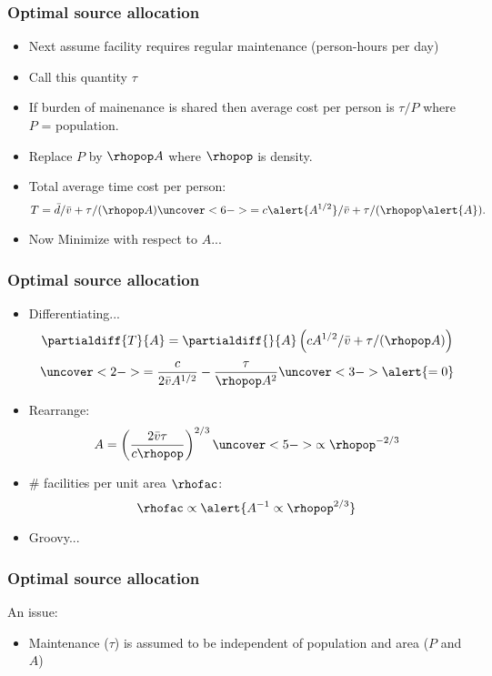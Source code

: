 \begin{frame}
  \frametitle{Optimal source allocation}

  \begin{itemize}
  \item<1-> Next assume facility requires regular maintenance (person-hours per day)
  \item<2-> Call this quantity $\tau$
  \item<3-> If burden of mainenance is shared then average cost per person
    is \alert{$\tau/P$} where $P$ = population.
  \item<4-> Replace $P$ by $\rhopop A$ where $\rhopop$ is density.
  \item<5-> Total average time cost per person:
    $$
    T = \bar{d}/\bar{v} + \tau/(\rhopop A) 
    \uncover<6->{= c \alert{A^{1/2}}/\bar{v} + \tau/(\rhopop \alert{A}).}
    $$
  \item<7-> Now Minimize with respect to $A$...
  \end{itemize}

\end{frame}

\begin{frame}
  \frametitle{Optimal source allocation}

  \begin{itemize}
  \item<1-> Differentiating...
    $$
    \partialdiff{T}{A} = 
    \partialdiff{}{A} \left( c A^{1/2}/\bar{v} + \tau/(\rhopop A) \right)
    $$
    $$
    \uncover<2->{
      =
      \frac{c}{2\bar{v} A^{1/2}}
      -\frac{\tau}{\rhopop A^2}
    }
    \uncover<3->{
      \alert{ = 0 }
    }
    $$
  \item<4-> Rearrange:
    $$
    A = 
    \left(
      \frac{2 \bar{v} \tau}
      {c \rhopop}
    \right)^{2/3}
    \uncover<5->{
      \propto \rhopop^{-2/3}
    }
    $$
  \item<6-> \# facilities per unit area $\rhofac$:
    $$ 
    \rhofac
    \propto
    \alert{A^{-1}  \propto \rhopop^{2/3}}
    $$
  \item<7-> Groovy...
    
  \end{itemize}

\end{frame}

\begin{frame}
  \frametitle{Optimal source allocation}

  \begin{block}{An issue:}
    \begin{itemize}
    \item<1-> Maintenance ($\tau$) is assumed to be 
      \alert{independent} of population
      and area ($P$ and $A$)
    \end{itemize}
  \end{block}
  
\end{frame}

